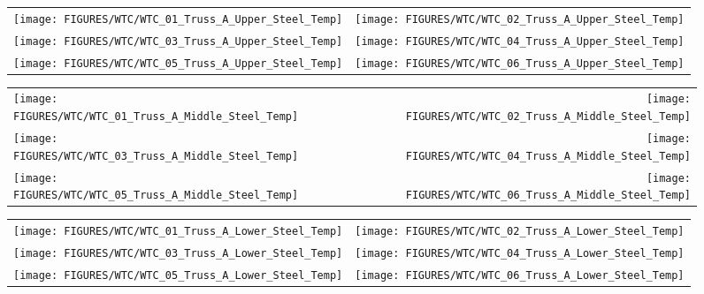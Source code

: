 \begin{figure}[p]
\begin{tabular*}{\textwidth}{l@{\extracolsep{\fill}}r}
\texttt{[image: FIGURES/WTC/WTC\_01\_Truss\_A\_Upper\_Steel\_Temp]} &
\texttt{[image: FIGURES/WTC/WTC\_02\_Truss\_A\_Upper\_Steel\_Temp]} \\
\texttt{[image: FIGURES/WTC/WTC\_03\_Truss\_A\_Upper\_Steel\_Temp]} &
\texttt{[image: FIGURES/WTC/WTC\_04\_Truss\_A\_Upper\_Steel\_Temp]} \\
\texttt{[image: FIGURES/WTC/WTC\_05\_Truss\_A\_Upper\_Steel\_Temp]} &
\texttt{[image: FIGURES/WTC/WTC\_06\_Truss\_A\_Upper\_Steel\_Temp]}
\end{tabular*}
\label{NIST_WTC_Truss_A_Upper_Steel_Temp}
\end{figure}

\begin{figure}[p]
\begin{tabular*}{\textwidth}{l@{\extracolsep{\fill}}r}
\texttt{[image: FIGURES/WTC/WTC\_01\_Truss\_A\_Middle\_Steel\_Temp]} &
\texttt{[image: FIGURES/WTC/WTC\_02\_Truss\_A\_Middle\_Steel\_Temp]} \\
\texttt{[image: FIGURES/WTC/WTC\_03\_Truss\_A\_Middle\_Steel\_Temp]} &
\texttt{[image: FIGURES/WTC/WTC\_04\_Truss\_A\_Middle\_Steel\_Temp]} \\
\texttt{[image: FIGURES/WTC/WTC\_05\_Truss\_A\_Middle\_Steel\_Temp]} &
\texttt{[image: FIGURES/WTC/WTC\_06\_Truss\_A\_Middle\_Steel\_Temp]}
\end{tabular*}
\label{NIST_WTC_Truss_A_Middle_Steel_Temp}
\end{figure}

\begin{figure}[p]
\begin{tabular*}{\textwidth}{l@{\extracolsep{\fill}}r}
\texttt{[image: FIGURES/WTC/WTC\_01\_Truss\_A\_Lower\_Steel\_Temp]} &
\texttt{[image: FIGURES/WTC/WTC\_02\_Truss\_A\_Lower\_Steel\_Temp]} \\
\texttt{[image: FIGURES/WTC/WTC\_03\_Truss\_A\_Lower\_Steel\_Temp]} &
\texttt{[image: FIGURES/WTC/WTC\_04\_Truss\_A\_Lower\_Steel\_Temp]} \\
\texttt{[image: FIGURES/WTC/WTC\_05\_Truss\_A\_Lower\_Steel\_Temp]} &
\texttt{[image: FIGURES/WTC/WTC\_06\_Truss\_A\_Lower\_Steel\_Temp]}
\end{tabular*}
\label{NIST_WTC_Truss_A_Lower_Steel_Temp}
\end{figure}

